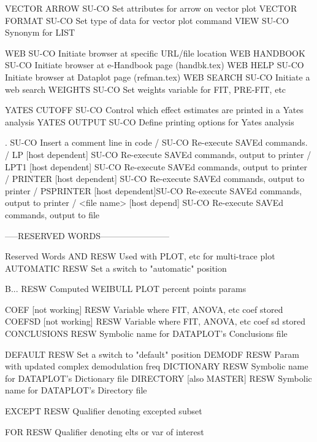 VECTOR ARROW                SU-CO Set attributes for arrow on vector plot
VECTOR FORMAT               SU-CO Set type of data for vector plot command
VIEW                        SU-CO Synonym for LIST

WEB                         SU-CO Initiate browser at specific URL/file location
WEB HANDBOOK                SU-CO Initiate browser at e-Handbook page (handbk.tex)
WEB HELP                    SU-CO Initiate browser at Dataplot page (refman.tex)
WEB SEARCH                  SU-CO Initiate a web search
WEIGHTS                     SU-CO Set weights variable for FIT, PRE-FIT, etc

YATES CUTOFF                SU-CO Control which effect estimates are printed in a Yates analysis
YATES OUTPUT                SU-CO Define printing options for Yates analysis

.                           SU-CO Insert a comment line in code
/                           SU-CO Re-execute SAVEd commands.
/ LP [host dependent]       SU-CO Re-execute SAVEd commands, output to printer
/ LPT1 [host dependent]     SU-CO Re-execute SAVEd commands, output to printer
/ PRINTER [host dependent]  SU-CO Re-execute SAVEd commands, output to printer
/ PSPRINTER [host dependent]SU-CO Re-execute SAVEd commands, output to printer
/ <file name> [host depend] SU-CO Re-execute SAVEd commands, output to file

-----RESERVED WORDS------------------------

Reserved Words
AND                         RESW  Used with PLOT, etc for multi-trace plot
AUTOMATIC                   RESW  Set a switch to "automatic" position

B...                        RESW  Computed WEIBULL PLOT percent points params

COEF      [not working]     RESW  Variable where FIT, ANOVA, etc coef stored
COEFSD    [not working]     RESW  Variable where FIT, ANOVA, etc coef sd stored
CONCLUSIONS                 RESW  Symbolic name for DATAPLOT's Conclusions file

DEFAULT                     RESW  Set a switch to "default" position
DEMODF                      RESW  Param with updated complex demodulation freq
DICTIONARY                  RESW  Symbolic name for DATAPLOT's Dictionary file
DIRECTORY [also MASTER]     RESW  Symbolic name for DATAPLOT's Directory file

EXCEPT                      RESW  Qualifier denoting excepted subset

FOR                         RESW  Qualifier denoting elts or var of interest

